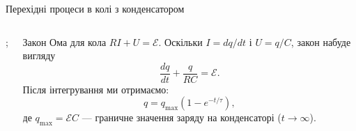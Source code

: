 \documentclass[onlytextwidth]{beamer}
\begin{document}
\begin{frame}{Перехідні процеси в колі з конденсатором}{}
\begin{onlyenv}
\begin{columns}
\begin{column}{0.3\linewidth}
\begin{circuitikz}[european, scale=0.7, transform shape]
					;
				\end{circuitikz}
			\end{column}
			\begin{column}{0.7\linewidth}
				\begin{block}{}
					Закон Ома для кола $RI + U = \mathcal{E}$. Оскільки $I = dq/dt$ і $U= q/C$, закон набуде вигляду
					\begin{equation*}
						\frac{dq}{dt}  + \frac{q}{RC} =  \mathcal{E}.
					\end{equation*}
					Після інтегрування ми отримаємо:
					\begin{equation*}
						q =  q_{\max}(1 - e^{- t / \tau}),
					\end{equation*}
					де $q_{\max} = \mathcal{E} C$ --- граничне значення заряду на конденсаторі ($t \to \infty$).
				\end{block}
			\end{column}
		\end{columns}
	\end{onlyenv}
\end{frame}



%
\end{document}
